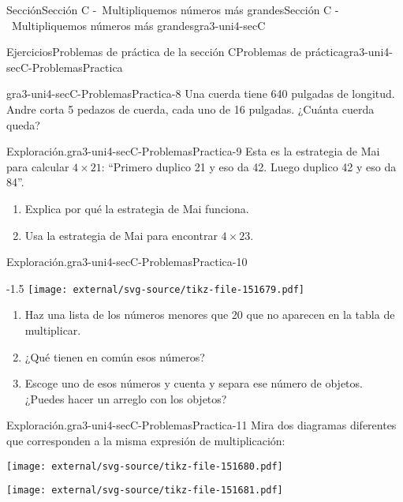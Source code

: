 \documentclass[twoside,10pt,]{article}
\begin{document}
\begin{sectionptx}{Sección}{Sección C -~Multipliquemos números más grandes}{}{Sección C -~Multipliquemos números más grandes}{}{}{gra3-uni4-secC}
\begin{exercises-subsection}{Ejercicios}{Problemas de práctica de la sección C}{}{Problemas de práctica}{}{}{gra3-uni4-secC-ProblemasPractica}
\begin{divisionexercise}{6}{}{}{gra3-uni4-secC-ProblemasPractica-8}%
Una cuerda tiene 640 pulgadas de longitud. Andre corta 5 pedazos de cuerda, cada uno de 16 pulgadas. ¿Cuánta cuerda queda?%
\end{divisionexercise}%
\begin{divisionexercise}{7}{Exploración.}{}{gra3-uni4-secC-ProblemasPractica-9}%
Esta es la estrategia de Mai para calcular \(4 \times 21\): “Primero duplico 21 y eso da 42. Luego duplico 42 y eso da 84”.%
%
\begin{enumerate}[label=(\alph*)]
\item{}Explica por qué la estrategia de Mai funciona.%
\item{}Usa la estrategia de Mai para encontrar \(4 \times 23\).%
\end{enumerate}
\end{divisionexercise}%
\begin{divisionexercise}{8}{Exploración.}{}{gra3-uni4-secC-ProblemasPractica-10}%
\begin{image}{0}{1}{0}{-1.5\baselineskip}%
\texttt{[image: external/svg-source/tikz-file-151679.pdf]}
\end{image}%
%
\begin{enumerate}[label=(\alph*)]
\item{}Haz una lista de los números menores que 20 que no aparecen en la tabla de multiplicar.%
\item{}¿Qué tienen en común esos números?%
\item{}Escoge uno de esos números y cuenta y separa ese número de objetos. ¿Puedes hacer un arreglo con los objetos?%
\end{enumerate}
\end{divisionexercise}%
\begin{divisionexercise}{9}{Exploración.}{}{gra3-uni4-secC-ProblemasPractica-11}%
Mira dos diagramas diferentes que corresponden a la misma expresión de multiplicación:%
\begin{sidebyside}{2}{0.025}{0.025}{0.05}%
\begin{sbspanel}{0.45}%
\texttt{[image: external/svg-source/tikz-file-151680.pdf]}
\end{sbspanel}%
\begin{sbspanel}{0.45}%
\texttt{[image: external/svg-source/tikz-file-151681.pdf]}
\end{sbspanel}%
\end{sidebyside}%
%
\begin{enumerate}[label=(\alph*)]

\end{enumerate}
\end{divisionexercise}
\end{exercises-subsection}
\end{sectionptx}
\end{document}
